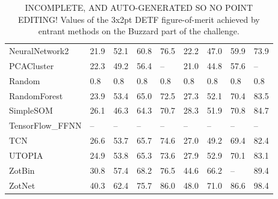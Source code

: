 \documentclass[twocolumn,twocolappendix]{aastex63}
\begin{document}
\begin{table}[]
\begin{tabular}{|l|llll|llll|}
{\sc NeuralNetwork2 } & 21.9 & 52.1    & 60.8    & 76.5    & 22.2             & 47.0             & 59.9             & 73.9\\
{\sc PCACluster } & 22.3 & 49.2    & 56.4    & --    & 21.0             & 44.8             & 57.6             & --\\
{\sc Random } & 0.8 & 0.8    & 0.8    & 0.8    & 0.8             & 0.8             & 0.8             & 0.8\\
{\sc RandomForest } & 23.9 & 53.4    & 65.0    & 72.5    & 27.3             & 52.1             & 70.4             & 83.5\\
{\sc SimpleSOM } & 26.1 & 46.3    & 64.3    & 70.7    & 28.3             & 51.9             & 70.8             & 84.7\\
{\sc TensorFlow\_FFNN } & -- & --    & --    & --    & --             & --             & --             & --\\
{\sc TCN } & 26.6 & 53.7    & 65.7    & 74.6    & 27.0             & 49.2             & 69.4             & 82.4\\
{\sc UTOPIA } & 24.9 & 53.8    & 65.3    & 73.6    & 27.9             & 52.9             & 70.1             & 83.1\\
{\sc ZotBin } & 30.8 & 57.4    & 68.2    & 76.5    & 44.6             & 66.2             & --             & 89.4\\
{\sc ZotNet } & 40.3 & 62.4    & 75.7    & 86.0    & 48.0             & 71.0             & 86.6             & 98.4\\
\end{tabular}
\caption{INCOMPLETE, AND AUTO-GENERATED SO NO POINT EDITING! Values of the 3x2pt DETF figure-of-merit achieved by entrant methods on the 
Buzzard part of the challenge.}
\label{tab:buzzard_3x2}
\end{table}
\end{document}
